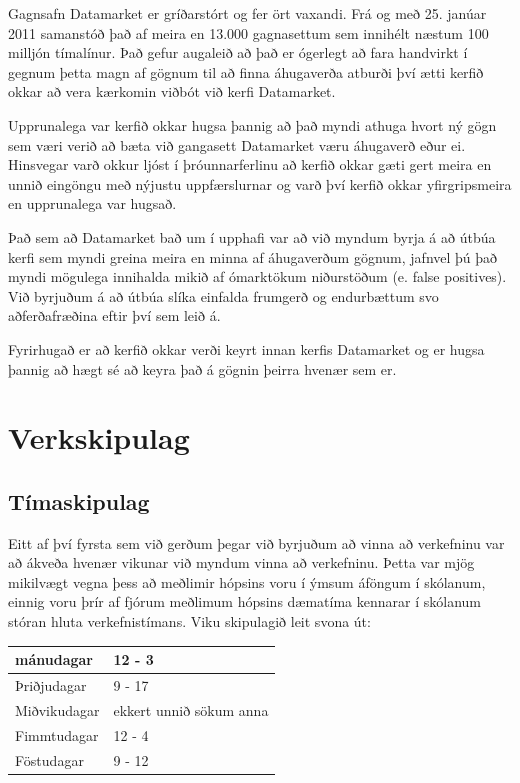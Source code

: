 \documentclass{article}
\begin{document}
Gagnsafn Datamarket er gríðarstórt og fer ört vaxandi. Frá og með 25. janúar 2011 samanstóð það af meira en 13.000 gagnasettum sem innihélt næstum 100 milljón tímalínur. Það gefur augaleið að það er ógerlegt að fara handvirkt í gegnum þetta magn af gögnum til að finna áhugaverða atburði því ætti kerfið okkar að vera kærkomin viðbót við kerfi Datamarket.

Upprunalega var kerfið okkar hugsa þannig að það myndi athuga hvort ný gögn sem
væri verið að bæta við gangasett Datamarket væru áhugaverð eður ei. Hinsvegar
varð okkur ljóst í þróunnarferlinu að kerfið okkar gæti gert meira en unnið
eingöngu með nýjustu uppfærslurnar og varð því kerfið okkar yfirgripsmeira en
upprunalega var hugsað.

Það sem að Datamarket bað um í upphafi var að við myndum byrja á að útbúa kerfi sem myndi greina meira en minna af áhugaverðum gögnum, jafnvel þú það myndi mögulega innihalda mikið af ómarktökum niðurstöðum (e. false positives). Við byrjuðum á að útbúa slíka einfalda frumgerð og endurbættum svo aðferðafræðina eftir því sem leið á.

Fyrirhugað er að kerfið okkar verði keyrt innan kerfis Datamarket og er hugsa þannig að hægt sé að keyra það á gögnin þeirra hvenær sem er.

\newpage

\section{Verkskipulag}

\subsection{Tímaskipulag}

Eitt af því fyrsta sem við gerðum þegar við byrjuðum að vinna að verkefninu var að ákveða hvenær vikunar við myndum vinna að verkefninu. Þetta var mjög mikilvægt vegna þess að meðlimir hópsins voru í ýmsum áföngum í skólanum, einnig voru þrír af fjórum meðlimum hópsins dæmatíma kennarar í skólanum stóran hluta verkefnistímans. 
Viku skipulagið leit svona út:

\vspace{5 mm}
\begin{tabular}{| l | l |}
\hline
  mánudagar & 12 - 3 \\
  \hline
  Þriðjudagar & 9 - 17 \\
  \hline
  Miðvikudagar & ekkert unnið sökum anna \\
  \hline
  Fimmtudagar & 12 - 4 \\
  \hline
  Föstudagar & 9 - 12\\
\hline
\end{tabular}
\vspace{5 mm}
\end{document}
